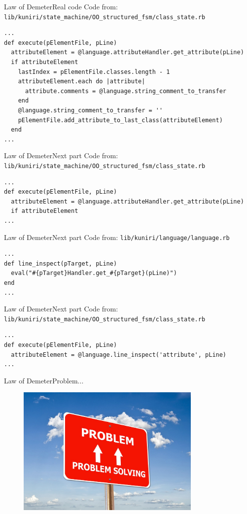 \documentclass[10pt]{beamer}
\begin{document}
\begin{frame}[fragile]{Law of Demeter}{Real code}
Code from:
\verb|lib/kuniri/state_machine/OO_structured_fsm/class_state.rb|
\small
\begin{lstlisting}
...
def execute(pElementFile, pLine)
  attributeElement = @language.attributeHandler.get_attribute(pLine)
  if attributeElement
    lastIndex = pElementFile.classes.length - 1
    attributeElement.each do |attribute|
      attribute.comments = @language.string_comment_to_transfer
    end
    @language.string_comment_to_transfer = ''
    pElementFile.add_attribute_to_last_class(attributeElement)
  end
...
\end{lstlisting}
\end{frame}

\begin{frame}[fragile]{Law of Demeter}{Next part}
Code from:
\verb|lib/kuniri/state_machine/OO_structured_fsm/class_state.rb|
\small
\begin{lstlisting}
...
def execute(pElementFile, pLine)
  attributeElement = @language.attributeHandler.get_attribute(pLine)
  if attributeElement
...
\end{lstlisting}
\end{frame}

\begin{frame}[fragile]{Law of Demeter}{Next part}
Code from:
\verb|lib/kuniri/language/language.rb|
\small
\begin{lstlisting}
...
def line_inspect(pTarget, pLine)
  eval("#{pTarget}Handler.get_#{pTarget}(pLine)")
end
...
\end{lstlisting}
\end{frame}

\begin{frame}[fragile]{Law of Demeter}{Next part}
Code from:
\verb|lib/kuniri/state_machine/OO_structured_fsm/class_state.rb|
\small
\begin{lstlisting}
...
def execute(pElementFile, pLine)
  attributeElement = @language.line_inspect('attribute', pLine)
...
\end{lstlisting}
\end{frame}

\begin{frame}[fragile]{Law of Demeter}{Problem...}
  \begin{figure}[overview]
    \includegraphics[width=0.8\textwidth]{images/problem.jpg}
  \end{figure}
\end{frame}
\end{document}
